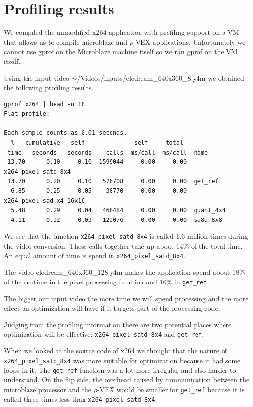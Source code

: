 \documentclass{article}
\newcommand{\rvex}{\ensuremath{\rho}-VEX}
\newcommand{\satd}{\texttt{x264\_pixel\_satd\_8x4}}
\newcommand{\getref}{\texttt{get\_ref}}
\begin{document}
\section{Profiling results}

We compiled the unmodified x264 application with profiling support on a VM that
allows us to compile microblaze and \rvex{} applications. 
Unfortunately we
cannot use gprof on the Microblaze machine itself so we ran gprof on the VM
itself.

	Using the input video $\sim$/Videos/inputs/eledream\_640x360\_8.y4m we obtained
the following profiling results.

\begin{small}\begin{lstlisting}
gprof x264 | head -n 10
Flat profile:

Each sample counts as 0.01 seconds.
  %   cumulative   self              self     total
 time   seconds   seconds    calls  ms/call  ms/call  name
 13.70      0.10     0.10  1599044     0.00     0.00  x264_pixel_satd_8x4
 13.70      0.20     0.10   570708     0.00     0.00  get_ref
  6.85      0.25     0.05    38770     0.00     0.00  x264_pixel_sad_x4_16x16
  5.48      0.29     0.04   460484     0.00     0.00  quant_4x4
  4.11      0.32     0.03   123076     0.00     0.00  sa8d_8x8
\end{lstlisting}\end{small}

We see that the function \satd{} is called 1.6 million times during the video
conversion. 
These calls together take up about $14\%$ of the total time. 
An
equal amount of time is spend in \satd{}.

The video eledream\_640x360\_128.y4m makes the application spend about $18\%$
of the runtime in the pixel processing function and $16\%$ in \getref{}.

The bigger our input video the more time we will spend processing and the more
effect an optimization will have if it targets part of the processing code.

Judging from the profiling information there are two potential places where
optimization will be effective: \satd{} and \getref{}.

When we looked at the source code of x264 we thought that the nature of \satd{}
was more suitable for optimization because it had some loops in it. 
The
\getref{} function was a lot more irregular and also harder to understand. 
On
the flip side, the overhead caused by communication between the microblaze
processor and the \rvex{} would be smaller for \getref{} because it is called
three times less than \satd{}.
\end{document}
